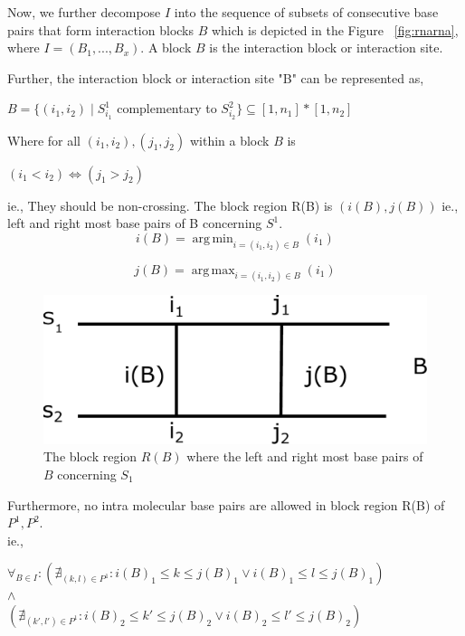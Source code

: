 \documentclass[twoside,a4paper]{report}
\DeclareMathOperator*{\argmin}{arg\,min}
\DeclareMathOperator*{\argmax}{arg\,max}
\begin{document}
 	Now, we further decompose $I$ into the sequence of subsets of consecutive base pairs that form interaction blocks $B$ which is depicted in the Figure ~\ref{fig:rnarna}, where $ I = (B_1 ,..., B_x)$. A block $B$ is the interaction block or interaction site.
 
 	Further, the interaction block or interaction site "B" can be represented as,
 	
 	\begin{center}
 	 $B = \{ (i_1 , i_2)  \mid  S^1_{i_1}$ complementary to $ S^2_{i_2} \} \subseteq [ 1, n_1] * [1 , n_2] $
 	\end{center}
 	
 	Where for all $(i_1 ,i_2) ,(j_1, j_2) $ within a block $B$ is 
 	
 	\begin{center}
 		$(i_1 < i_2) \iff  (j_1 > j_2)$
 	\end{center}
 	
 	ie., They should be non-crossing.  The block region R(B) is $(i(B) , j(B))$ ie., left and right most base pairs of B concerning $S^1$.\\
 	
 	\begin{equation*}
 		i(B) = \argmin_{i = (i_1, i_2 ) \in B } (i_1)
 	\end{equation*}
 
 	\begin{equation*}
 			j(B) = \argmax_{i = (i_1, i_2 ) \in B} (i_1)
 	\end{equation*}
 	
 	\begin{figure}[tb]
 		\includegraphics[width=0.6\linewidth]{block.pdf}
 		\centering
 		\caption{The block region $R(B)$ where the left and right most base pairs of $B$ concerning $S_1$}
 		\label{fig:block}
 	\end{figure}
 
 	 Furthermore, no intra molecular base pairs are allowed in block region R(B) of $P^1 , P^2$.\\
 	 ie.,
 	\begin{center}
 		 $\forall_{B\in I } : \left(\nexists_{(k,l) \in P^1} : i(B)_1 \le k \le j(B)_1  \vee   i(B)_1 \le l \le j(B)_1 \right) $ \\$\wedge $\\ 	$\left(\nexists_{(k',l') \in P^1} : i(B)_2 \le k' \le j(B)_2  \vee  i(B)_2 \le l' \le j(B)_2\right) $
 	\end{center}
 	
\end{document}
